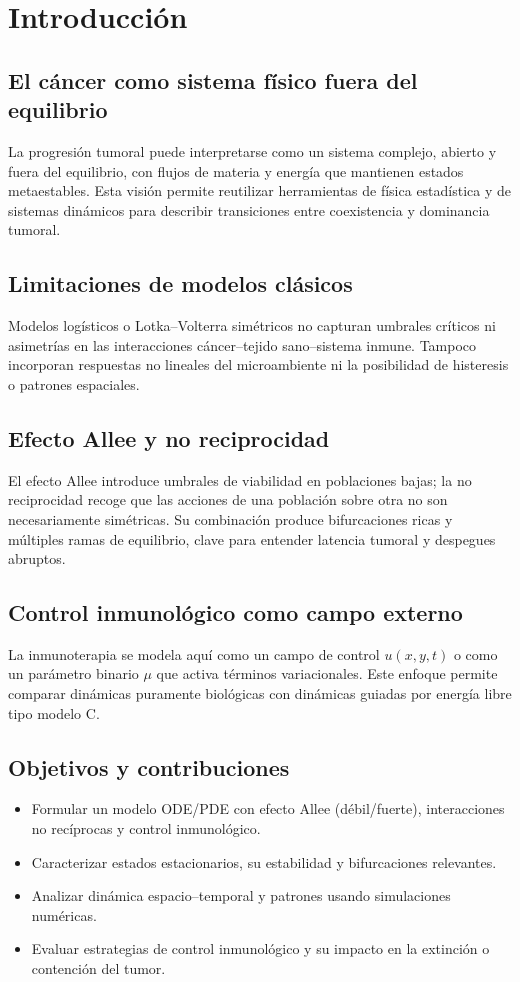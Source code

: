 \chapter{Introducción}

\section{El cáncer como sistema físico fuera del equilibrio}
La progresión tumoral puede interpretarse como un sistema complejo, abierto y fuera del equilibrio, con flujos de materia y energía que mantienen estados metaestables. Esta visión permite reutilizar herramientas de física estadística y de sistemas dinámicos para describir transiciones entre coexistencia y dominancia tumoral.

\section{Limitaciones de modelos clásicos}
Modelos logísticos o Lotka--Volterra simétricos no capturan umbrales críticos ni asimetrías en las interacciones cáncer--tejido sano--sistema inmune. Tampoco incorporan respuestas no lineales del microambiente ni la posibilidad de histeresis o patrones espaciales.

\section{Efecto Allee y no reciprocidad}
El efecto Allee introduce umbrales de viabilidad en poblaciones bajas; la no reciprocidad recoge que las acciones de una población sobre otra no son necesariamente simétricas. Su combinación produce bifurcaciones ricas y múltiples ramas de equilibrio, clave para entender latencia tumoral y despegues abruptos.

\section{Control inmunológico como campo externo}
La inmunoterapia se modela aquí como un campo de control $u(x,y,t)$ o como un parámetro binario $\mu$ que activa términos variacionales. Este enfoque permite comparar dinámicas puramente biológicas con dinámicas guiadas por energía libre tipo modelo C.

\section{Objetivos y contribuciones}
\begin{itemize}
    \item Formular un modelo ODE/PDE con efecto Allee (débil/fuerte), interacciones no recíprocas y control inmunológico.
    \item Caracterizar estados estacionarios, su estabilidad y bifurcaciones relevantes.
    \item Analizar dinámica espacio--temporal y patrones usando simulaciones numéricas.
    \item Evaluar estrategias de control inmunológico y su impacto en la extinción o contención del tumor.
\end{itemize}


